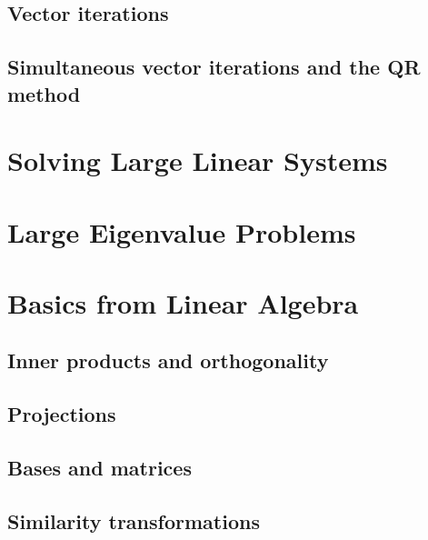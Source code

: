 \section{Vector iterations}

\section{Simultaneous vector iterations and the QR method}

%

\chapter{Solving Large Linear Systems}

\chapter{Large Eigenvalue Problems}

\appendix
\chapter{Basics from Linear Algebra}
\section{Inner products and orthogonality}

\section{Projections}
\section{Bases and matrices}

\section{Similarity transformations}




\printindex

